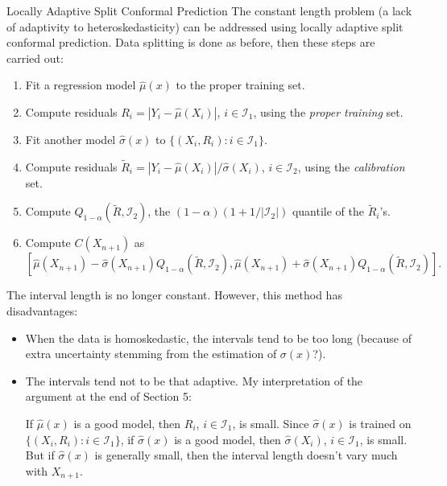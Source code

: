 \documentclass{beamer}
\begin{document}
\begin{frame}[allowframebreaks]{Locally Adaptive Split Conformal Prediction}
    The constant length problem (a lack of adaptivity to heteroskedasticity) can be addressed using locally adaptive split conformal prediction. Data splitting is done as before, then these steps are carried out:
    \begin{enumerate}
        \item Fit a regression model $\widehat{\mu}(x)$ to the proper training set.
        \item Compute residuals $R_i = |Y_i - \widehat{\mu}(X_i)|$, $i \in \mathcal{I}_1$, using the \emph{proper training} set.
        \item Fit another model $\widehat{\sigma}(x)$ to $\{(X_i, R_i): i \in \mathcal{I}_1\}$.
        \item Compute residuals $\widetilde{R}_i = |Y_i - \widehat{\mu}(X_i)| / \widehat{\sigma}(X_i)$, $i \in \mathcal{I}_2$, using the \emph{calibration} set.
        \item Compute $Q_{1 - \alpha}(\widetilde{R}, \mathcal{I}_2)$, the $(1 - \alpha)(1 + 1 / |\mathcal{I}_2|)$ quantile of the $\widetilde{R}_i$'s.
        \item Compute $C(X_{n + 1})$ as
        \[
        [\widehat{\mu}(X_{n + 1}) - \widehat{\sigma}(X_{n + 1})Q_{1 - \alpha}(\widetilde{R}, \mathcal{I}_2), \widehat{\mu}(X_{n + 1}) + \widehat{\sigma}(X_{n + 1})Q_{1 - \alpha}(\widetilde{R}, \mathcal{I}_2)].
        \]
    \end{enumerate}

    \framebreak

    The interval length is no longer constant. However, this method has disadvantages:
    \begin{itemize}
        \item When the data is homoskedastic, the intervals tend to be too long (because of extra uncertainty stemming from the estimation of $\sigma(x)$?).
        \item The intervals tend not to be that adaptive. My interpretation of the argument at the end of Section 5:

        \medskip

        If $\widehat{\mu}(x)$ is a good model, then $R_i$, $i \in \mathcal{I}_1$, is small. Since $\widehat{\sigma}(x)$ is trained on $\{(X_i, R_i): i \in \mathcal{I}_1\}$, if $\widehat{\sigma}(x)$ is a good model, then $\widehat{\sigma}(X_i)$, $i \in \mathcal{I}_1$, is small. But if $\widehat{\sigma}(x)$ is generally small, then the interval length doesn't vary much with $X_{n + 1}$.
    \end{itemize}
\end{frame}
\end{document}
